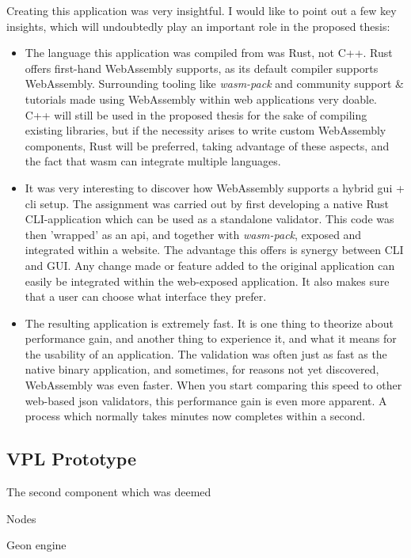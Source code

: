 Creating this application was very insightful. I would like to point out a few key insights, which will undoubtedly play an important role in the proposed thesis: 

\begin{itemize}

    \item The language this application was compiled from was Rust, not C++. Rust offers first-hand WebAssembly supports, as its default compiler supports WebAssembly. Surrounding tooling like \textit{wasm-pack} and community support \& tutorials made using WebAssembly within web applications very doable. 
    C++ will still be used in the proposed thesis for the sake of compiling existing libraries, but if the necessity arises to write custom WebAssembly components, Rust will be preferred, taking advantage of these aspects, and the fact that wasm can integrate multiple languages.

    \item It was very interesting to discover how WebAssembly supports a hybrid gui + cli setup. 
    The assignment was carried out by first developing a native Rust CLI-application which can be used as a standalone validator. 
    This code was then 'wrapped' as an api, and together with \textit{wasm-pack}, exposed and integrated within a website. 
    The advantage this offers is synergy between CLI and GUI. Any change made or feature added to the original application can easily be integrated within the web-exposed application. It also makes sure that a user can choose what interface they prefer. 


    \item The resulting application is extremely fast. It is one thing to theorize about performance gain, and another thing to experience it, and what it means for the usability of an application. The validation was often just as fast as the native binary application, and sometimes, for reasons not yet discovered, WebAssembly was even faster. When you start comparing this speed to other web-based json validators, this performance gain is even more apparent. A process which normally takes minutes now completes within a second. 




\end{itemize}







\subsection*{VPL Prototype}

The second component which was deemed 

Nodes 

Geon engine
